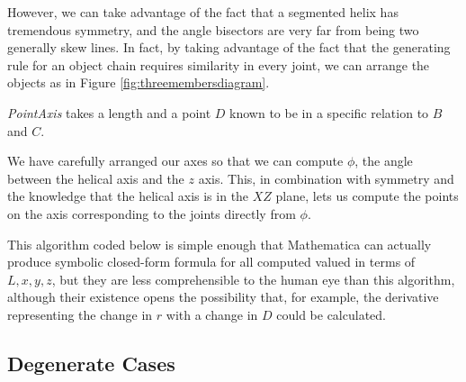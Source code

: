 \documentclass[11pt]{article}
\begin{document}
{However, we can take advantage of the fact that a segmented helix has
tremendous symmetry, and the angle bisectors are very far from being two
generally skew lines. In fact, by taking advantage of the fact that the
generating rule for an object chain requires similarity in every joint,
we can arrange the objects as in Figure \ref{fig:threemembersdiagram}.

{\em PointAxis} takes a length and a point $D$ known to be in
a specific relation to $B$ and $C$.

We have carefully arranged our axes
so that we can compute $\phi$, the angle between the helical axis
and the $z$ axis. This, in combination with symmetry and the knowledge
that the helical axis is in the $XZ$ plane, lets us compute the
points on the axis corresponding to the joints directly from $\phi$.

This algorithm coded below is simple enough that Mathematica\cite{Mathematica} can
actually produce symbolic closed-form formula for all computed valued
in terms of $L, x, y, z$, but they are less comprehensible to the
human eye than this algorithm, although their existence opens
the possibility that, for example, the derivative representing
the change in $r$ with a change in $D$ could be calculated.

\subsection{Degenerate Cases}

}
\end{document}
